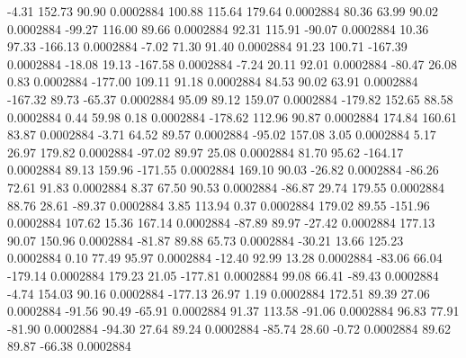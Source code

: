        -4.31      152.73       90.90     0.0002884
      100.88      115.64      179.64     0.0002884
       80.36       63.99       90.02     0.0002884
      -99.27      116.00       89.66     0.0002884
       92.31      115.91      -90.07     0.0002884
       10.36       97.33     -166.13     0.0002884
       -7.02       71.30       91.40     0.0002884
       91.23      100.71     -167.39     0.0002884
      -18.08       19.13     -167.58     0.0002884
       -7.24       20.11       92.01     0.0002884
      -80.47       26.08        0.83     0.0002884
     -177.00      109.11       91.18     0.0002884
       84.53       90.02       63.91     0.0002884
     -167.32       89.73      -65.37     0.0002884
       95.09       89.12      159.07     0.0002884
     -179.82      152.65       88.58     0.0002884
        0.44       59.98        0.18     0.0002884
     -178.62      112.96       90.87     0.0002884
      174.84      160.61       83.87     0.0002884
       -3.71       64.52       89.57     0.0002884
      -95.02      157.08        3.05     0.0002884
        5.17       26.97      179.82     0.0002884
      -97.02       89.97       25.08     0.0002884
       81.70       95.62     -164.17     0.0002884
       89.13      159.96     -171.55     0.0002884
      169.10       90.03      -26.82     0.0002884
      -86.26       72.61       91.83     0.0002884
        8.37       67.50       90.53     0.0002884
      -86.87       29.74      179.55     0.0002884
       88.76       28.61      -89.37     0.0002884
        3.85      113.94        0.37     0.0002884
      179.02       89.55     -151.96     0.0002884
      107.62       15.36      167.14     0.0002884
      -87.89       89.97      -27.42     0.0002884
      177.13       90.07      150.96     0.0002884
      -81.87       89.88       65.73     0.0002884
      -30.21       13.66      125.23     0.0002884
        0.10       77.49       95.97     0.0002884
      -12.40       92.99       13.28     0.0002884
      -83.06       66.04     -179.14     0.0002884
      179.23       21.05     -177.81     0.0002884
       99.08       66.41      -89.43     0.0002884
       -4.74      154.03       90.16     0.0002884
     -177.13       26.97        1.19     0.0002884
      172.51       89.39       27.06     0.0002884
      -91.56       90.49      -65.91     0.0002884
       91.37      113.58      -91.06     0.0002884
       96.83       77.91      -81.90     0.0002884
      -94.30       27.64       89.24     0.0002884
      -85.74       28.60       -0.72     0.0002884
       89.62       89.87      -66.38     0.0002884
